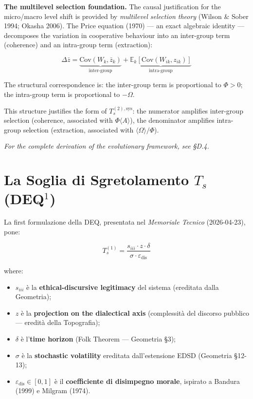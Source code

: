 \Proved{} \textbf{The multilevel selection foundation.} The causal
justification for the micro/macro level shift is provided by
\textit{multilevel selection theory} (Wilson \& Sober 1994; Okasha 2006).
The Price equation (1970) --- an exact algebraic identity --- decomposes
the variation in cooperative behaviour into an inter-group term
(coherence) and an intra-group term (extraction):

\[
\Delta\bar{z} = \underbrace{\mathrm{Cov}(W_k,\bar{z}_k)}_{\text{inter-group}} + \underbrace{\mathbb{E}_k\!\left[\mathrm{Cov}(W_{ik},z_{ik})\right]}_{\text{intra-group}} \tag{Price 1970}
\]

\Hypoth{} The structural correspondence is: the inter-group term is
proportional to \(\Phi > 0\); the intra-group term is proportional to
\(-\Omega\).

This structure justifies the form of \(T_s^{(2),\text{sys}}\): the
numerator amplifies inter-group selection (coherence, associated with
\(\Phi\langle A\rangle\)), the denominator amplifies intra-group
selection (extraction, associated with \(\langle\Omega\rangle/\Phi\)).

\textit{For the complete derivation of the evolutionary framework, see §D.4.}



\section{\texorpdfstring{La Soglia di Sgretolamento \(T_s\)
(DEQ$^1$)}{La Soglia di Sgretolamento T\_s (DEQ$^1$)}}\label{la-soglia-di-sgretolamento-t_s-dequxb9}

La first formulazione della DEQ, presentata nel \emph{Memoriale Tecnico}
(2026-04-23), pone:

\[
T_s^{(1)} = \frac{s_{iii} \cdot z \cdot \delta}{\sigma \cdot \varepsilon_{\text{dis}}}
\]

where:

\begin{itemize}
\tightlist
\item
  \(s_{iii}\) è la \textbf{ethical-discursive legitimacy} del sistema
  (ereditata dalla Geometria);
\item
  \(z\) è la \textbf{projection on the dialectical axis} (complessità del
  discorso pubblico --- eredità della Topografia);
\item
  \(\delta\) è l'\textbf{time horizon} (Folk Theorem ---
  Geometria \S{}3);
\item
  \(\sigma\) è la \textbf{stochastic volatility} ereditata
  dall'estensione EDSD (Geometria \S{}12-13);
\item
  \(\varepsilon_{\text{dis}} \in [0,1]\) è il \textbf{coefficiente di
  disimpegno morale}, ispirato a Bandura (1999) e Milgram (1974).
\end{itemize}

